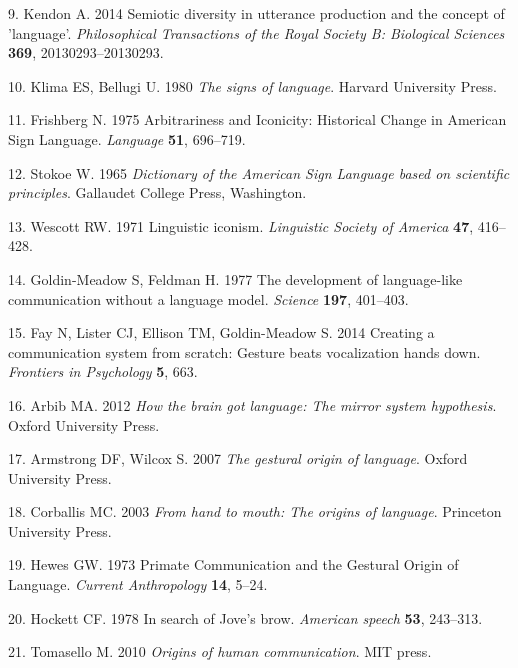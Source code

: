 \documentclass[english,floatsintext,man]{apa6}
\theoremstyle{definition}
\theoremstyle{definition}
\theoremstyle{definition}
\theoremstyle{remark}
\begin{document}
\leavevmode\hypertarget{ref-Kendon:2014eg}{}%
9. Kendon A. 2014 Semiotic diversity in utterance production and the
concept of 'language'. \emph{Philosophical Transactions of the Royal
Society B: Biological Sciences} \textbf{369}, 20130293--20130293.

\leavevmode\hypertarget{ref-Klima:1980si}{}%
10. Klima ES, Bellugi U. 1980 \emph{The signs of language}. Harvard
University Press.

\leavevmode\hypertarget{ref-Frishberg:1975dh}{}%
11. Frishberg N. 1975 Arbitrariness and Iconicity: Historical Change in
American Sign Language. \emph{Language} \textbf{51}, 696--719.

\leavevmode\hypertarget{ref-Stokoe:1965}{}%
12. Stokoe W. 1965 \emph{Dictionary of the American Sign Language based
on scientific principles}. Gallaudet College Press, Washington.

\leavevmode\hypertarget{ref-Wescott:1971to}{}%
13. Wescott RW. 1971 Linguistic iconism. \emph{Linguistic Society of
America} \textbf{47}, 416--428.

\leavevmode\hypertarget{ref-GoldinMeadow:1977gz}{}%
14. Goldin-Meadow S, Feldman H. 1977 The development of language-like
communication without a language model. \emph{Science} \textbf{197},
401--403.

\leavevmode\hypertarget{ref-Fay:2014cw}{}%
15. Fay N, Lister CJ, Ellison TM, Goldin-Meadow S. 2014 Creating a
communication system from scratch: Gesture beats vocalization hands
down. \emph{Frontiers in Psychology} \textbf{5}, 663.

\leavevmode\hypertarget{ref-Arbib:2012htb}{}%
16. Arbib MA. 2012 \emph{How the brain got language: The mirror system
hypothesis}. Oxford University Press.

\leavevmode\hypertarget{ref-Armstrong:2007go}{}%
17. Armstrong DF, Wilcox S. 2007 \emph{The gestural origin of language}.
Oxford University Press.

\leavevmode\hypertarget{ref-Corballis:2003ha}{}%
18. Corballis MC. 2003 \emph{From hand to mouth: The origins of
language}. Princeton University Press.

\leavevmode\hypertarget{ref-Hewes:1973vr}{}%
19. Hewes GW. 1973 Primate Communication and the Gestural Origin of
Language. \emph{Current Anthropology} \textbf{14}, 5--24.

\leavevmode\hypertarget{ref-Hockett:1978se}{}%
20. Hockett CF. 1978 In search of Jove's brow. \emph{American speech}
\textbf{53}, 243--313.

\leavevmode\hypertarget{ref-Tomasello:2010or}{}%
21. Tomasello M. 2010 \emph{Origins of human communication}. MIT press.
\end{document}
